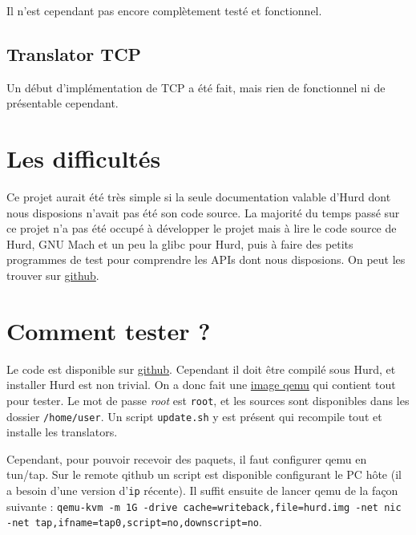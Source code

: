 \documentclass{article}
\begin{document}
Il n'est cependant pas encore complètement testé et fonctionnel.

\subsection{Translator TCP}
Un début d'implémentation de TCP a été fait, mais rien de fonctionnel ni de
présentable cependant.

\section{Les difficultés}
Ce projet aurait été très simple si la seule documentation valable d'Hurd dont
nous disposions n'avait pas été son code source. La majorité du temps passé sur
ce projet n'a pas été occupé à développer le projet mais à lire le code source
de Hurd, GNU Mach et un peu la glibc pour Hurd, puis à faire des petits programmes
de test pour comprendre les APIs dont nous disposions. On peut les trouver sur
\href{https://github.com/lucas8/ipc-mach}{github}.

\section{Comment tester ?}
Le code est disponible sur \href{https://github.com/lucas8/ENS_sysres}{github}.
Cependant il doit être compilé sous Hurd, et installer Hurd est non trivial.
On a donc fait une \href{https://download.dwarfmaster.net/hurd.img.xz}{image
qemu} qui contient tout pour tester. Le mot de passe \emph{root} est
\texttt{root}, et les sources sont disponibles dans les dossier
\texttt{/home/user}. Un script \texttt{update.sh} y est présent qui recompile
tout et installe les translators.

Cependant, pour pouvoir recevoir des paquets, il faut configurer qemu en tun/tap.
Sur le remote qithub un script est disponible configurant le PC hôte (il a besoin
d'une version d'\texttt{ip} récente). Il suffit ensuite de lancer qemu de la façon
suivante : \texttt{qemu-kvm -m 1G -drive cache=writeback,file=hurd.img -net nic
-net tap,ifname=tap0,script=no,downscript=no}.
\end{document}
